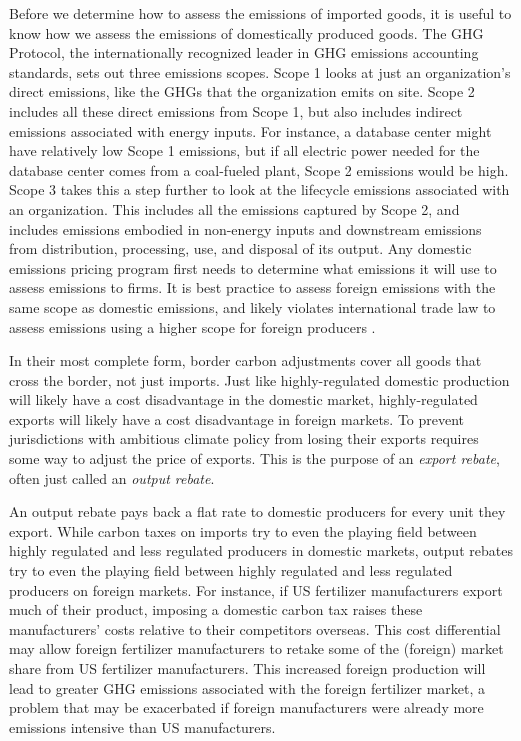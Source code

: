 Before we determine how to assess the emissions of imported goods, it is useful to know how we assess the emissions of domestically produced goods. The GHG Protocol, the internationally recognized leader in GHG emissions accounting standards, sets out three emissions scopes. Scope 1 looks at just an organization's direct emissions, like the GHGs that the organization emits on site. Scope 2 includes all these direct emissions from Scope 1, but also includes indirect emissions associated with energy inputs. For instance, a database center might have relatively low Scope 1 emissions, but if all electric power needed for the database center comes from a coal-fueled plant, Scope 2 emissions would be high. Scope 3 takes this a step further to look at the lifecycle emissions associated with an organization. This includes all the emissions captured by Scope 2, and includes emissions embodied in non-energy inputs and downstream emissions from distribution, processing, use, and disposal of its output. Any domestic emissions pricing program first needs to determine what emissions it will use to assess emissions to firms. It is best practice to assess foreign emissions with the same scope as domestic emissions, and likely violates international trade law to assess emissions using a higher scope for foreign producers \citep{cosbey2020developing}.


In their most complete form, border carbon adjustments cover all goods that cross the border, not just imports. Just like highly-regulated domestic production will likely have a cost disadvantage in the domestic market, highly-regulated exports will likely have a cost disadvantage in foreign markets. To prevent jurisdictions with ambitious climate policy from losing their exports requires some way to adjust the price of exports. This is the purpose of an \emph{export rebate}, often just called an \emph{output rebate}.

An output rebate pays back a flat rate to domestic producers for every unit they export. While carbon taxes on imports try to even the playing field between highly regulated and less regulated producers in domestic markets, output rebates try to even the playing field between highly regulated and less regulated producers on foreign markets. For instance, if US fertilizer manufacturers export much of their product, imposing a domestic carbon tax raises these manufacturers' costs relative to their competitors overseas. This cost differential may allow foreign fertilizer manufacturers to retake some of the (foreign) market share from US fertilizer manufacturers. This increased foreign production will lead to greater GHG emissions associated with the foreign fertilizer market, a problem that may be exacerbated if foreign manufacturers were already more emissions intensive than US manufacturers.

